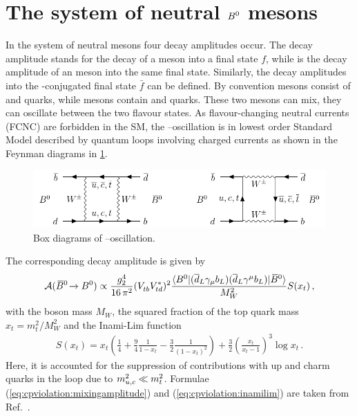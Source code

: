 
\section{The system of neutral \texorpdfstring{${{B}^0}$}{B0} mesons}
\label{sec:cpviolation:neutralBmesons}

In the system of neutral \Bd mesons four decay amplitudes occur. The decay
amplitude \Af stands for the decay of a \Bd meson into a final state $f$, while
\Abarf is the decay amplitude of an \Bdb meson into the same final state.
Similarly, the decay amplitudes into the \CP-conjugated final state $\bar{f}$
can be defined. By convention \Bd mesons consist of \bquarkbar and \dquark
quarks, while \Bdb mesons contain \bquark and \dquarkbar quarks. These two
mesons can mix, \ie they can oscillate between the two flavour states. As
flavour-changing neutral currents (FCNC) are forbidden in the SM, the
\Bd--\Bdb oscillation is in lowest order Standard Model described by quantum
loops involving charged currents as shown in the Feynman diagrams in
\cref{fig:cpviolation:neutralBmesons:boxdiagram}.
\begin{figure}[htb]
\centering
\includegraphics[width=\textwidth]{03-CPViolation/tikz/pdf/Boxdiagrams.pdf}
\caption{Box diagrams of \Bd--\Bdb oscillation.}
\label{fig:cpviolation:neutralBmesons:boxdiagram}
\end{figure}
The corresponding decay amplitude is given by
\begin{align}
	\mathcal{A}({{\kern 0.18em\overline{\kern -0.18em B}{}}{}^0}\!\rightarrow{\ensuremath{{B}^0}}) \propto \frac{g_2^4}{16\,\pi^2}({V_{{t}{b}}^{}}{V_{{t}{d}}^\ast})^2 \frac{\langle {\ensuremath{{B}^0}}|({\overline {{d}}}_L\gamma_\mu{\ensuremath{b}}_L)({\overline {{d}}}_L\gamma^\mu{\ensuremath{b}}_L)|{{\kern 0.18em\overline{\kern -0.18em B}{}}{}^0}\rangle}{M_W^2}S(x_t)\,,
\label{eq:cpviolation:mixingamplitude}
\end{align}
with the \W boson mass $M_W$, the squared fraction of the top quark mass $x_t
= m_t^2/M_W^2$ and the Inami-Lim function~\cite{Inami:1980fz}
\begin{align}
	S(x_t) = x_t \left(\frac 14 + \frac 94 \frac{1}{1 - x_t} - \frac 32 \frac{1}{(1 - x_t)^2}\right) + \frac 32 \left(\frac{x_t}{x_t - 1}\right)^3 \log x_t\,.
\label{eq:cpviolation:inamilim}
\end{align}
Here, it is accounted for the suppression of contributions with up and charm
quarks in the loop due to $m_{{u},{c}}^2 \ll m_{{t}}^2$. Formulae
(\ref{eq:cpviolation:mixingamplitude}) and (\ref{eq:cpviolation:inamilim}) are
taken from Ref.~\cite{Brock:2011zz}.

